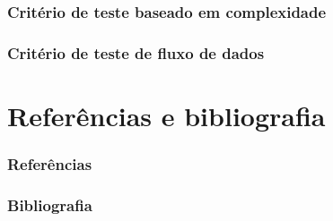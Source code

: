 \documentclass[utf8, usepdftitle=false, svgnames, color={table, fixpdftex, hyperref, fixinclude, xcdraw}, t, brazil]{beamer}
\begin{document}
		\section{Critério de teste baseado em complexidade}
		 

		\section{Critério de teste de fluxo de dados}
		  


	\part{Referências e bibliografia}

		\section{Referências}
		

		\section{Bibliografia}
		
	

% 		
\end{document}
